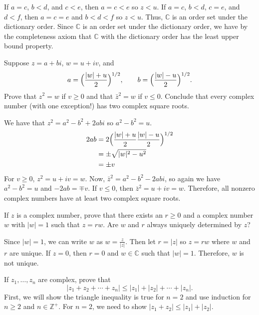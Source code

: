 \begin{exercise}
  If \(a = c\), \(b < d\), and \(c < e\), then \(a = c < e\) so \(z < u\).
  If \(a = c\), \(b < d\), \(c = e\), and \(d < f\), then \(a = c = e\) and
  \(b < d < f\) so \(z < u\).
  Thus, \(\mathbb{C}\) is an order set under the dictionary order.
  Since \(\mathbb{C}\) is an order set under the dictionary order, we have by
  the completeness axiom that \(\mathbb{C}\) with the dictionary order has the
  least upper bound property.
\item
  Suppose \(z = a + bi\), \(w = u + iv\), and
  \[
  a = \Bigl(\frac{\lvert w\rvert + u}{2}\Bigr)^{1/2},\qquad
  b = \Bigl(\frac{\lvert w\rvert - u}{2}\Bigr)^{1/2}.
  \]
  Prove that \(z^2 = w\) if \(v\geq 0\) and that \(\bar{z}^2 = w\) if
  \(v\leq 0\).
  Conclude that every complex number (with one exception!) has two complex
  square roots.
  \par\smallskip
  We have that \(z^2 = a^2 - b^2 + 2abi\) so \(a^2 - b^2 = u\).
  \begin{align*}
    2ab & = 2\Bigl(\frac{\lvert w\rvert + u}{2}
          \frac{\lvert w\rvert - u}{2}\Bigr)^{1/2}\\
        & = \pm\sqrt{\lvert w\rvert^2 - u^2}\\
        & = \pm v
  \end{align*}
  For \(v \geq 0\), \(z^2 = u + iv = w\).
  Now, \(\bar{z}^2 = a^2 - b^2 - 2abi\), so again we have \(a^2 - b^2 = u\) and
  \(-2ab = \mp v\).
  If \(v \leq 0\), then \(\bar{z}^2 = u + iv = w\).
  Therefore, all nonzero complex numbers have at least two complex square
  roots.
\item
  If \(z\) is a complex number, prove that there exists an \(r\geq 0\) and a
  complex number \(w\) with \(\lvert w\rvert = 1\) such that \(z = rw\).
  Are \(w\) and \(r\) always uniquely determined by \(z\)?
  \par\smallskip
  Since \(\lvert w\rvert = 1\), we can write \(w\) as
  \(w = \frac{z}{\lvert z\rvert}\).
  Then let \(r = \lvert z\rvert\) so \(z = rw\) where \(w\) and \(r\) are
  unique.
  If \(z = 0\), then \(r = 0\) and \(w\in\mathbb{C}\) such that
  \(\lvert w\rvert = 1\).
  Therefore, \(w\) is not unique.
\item
  If \(z_1,\ldots, z_n\) are complex, prove that
  \[
  \lvert z_1 + z_2 + \cdots + z_n\rvert\leq\lvert z_1\rvert + \lvert z_2\rvert
  + \cdots + \lvert z_n\rvert.
  \]
  First, we will show the triangle inequality is true for \(n = 2\) and use
  induction for \(n\geq 2\) and \(n\in\mathbb{Z}^+\).
  For \(n = 2\), we need to show
  \(\lvert z_1 + z_2\rvert\leq\lvert z_1\rvert + \lvert z_2\rvert\).

\end{exercise}
